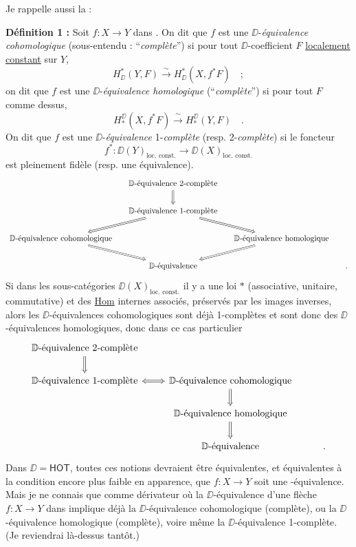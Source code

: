 Je rappelle aussi la :

\textbf{Définition 1 :} Soit $f : X \to Y$ dans \Dia. On dit que $f$ est une $\DD$-\textit{équivalence cohomologique} (sous-entendu : “\textit{complète}”) si pour tout $\DD$-coefficient $F$ \underline{localement} \underline{constant} sur $Y$,
\[ H^{*}_{\DD}(Y,F) \xrightarrow{\ \sim\ } H^{*}_{\DD}(X,f^{*}F) \quad ; \]
on dit que $f$ est une $\DD$-\textit{équivalence homologique} (“\textit{complète}”) si pour tout $F$ comme dessus,
\[ H_{*}^{\DD}(X,f^{*}F) \xrightarrow{\ \sim\ } H_{*}^{\DD}(Y,F) \quad . \]
On dit que $f$ est une $\DD$-\textit{équivalence} 1-\textit{complète} (resp. 2-\textit{complète}) si le foncteur
\[ f^{*} : \DD(Y)_{\text{loc. const.}} \longrightarrow \DD(X)_{\text{loc. const.}} \]
est pleinement fidèle (resp. une équivalence).
\[
\begin{tikzcd}[column sep=small]
 & \text{$\DD$-équivalence 2-complète} \arrow[d, Rightarrow] & & \\
 & \text{$\DD$-équivalence 1-complète} \arrow[dl, Rightarrow] \arrow[dr, Rightarrow] & & \\
\text{$\DD$-équivalence cohomologique} \arrow[dr, Rightarrow] & & \text{$\DD$-équivalence homologique} \arrow[dl, Rightarrow] & \\
 & \text{$\DD$-équivalence} & & .
\end{tikzcd}
\]
Si dans les sous-catégories $\DD(X)_{\text{loc. const.}}$ il y a une loi $*$ (associative, unitaire, commutative) et des \underline{\textsf{Hom}} internes associés, préservés par les images inverses, alors les $\DD$-équivalences cohomologiques sont déjà 1-complètes et sont donc des $\DD$-équivalences homologiques, donc dans ce cas particulier
\[
\begin{tikzcd}
\text{$\DD$-équivalence 2-complète} \arrow[d, Rightarrow] & & \\
\text{$\DD$-équivalence 1-complète} \arrow[r, Leftrightarrow] & \text{$\DD$-équivalence cohomologique} \arrow[d, Rightarrow] & \\
 & \text{$\DD$-équivalence homologique} \arrow[d, Rightarrow] & \\
 & \text{$\DD$-équivalence} & .
\end{tikzcd}
\]
Dans $\DD = \mathsf{HOT}$, toutes ces notions devraient être équivalentes, et équivalentes à la condition encore plus faible en apparence, que $f : X \to Y$ soit une \Hot-équivalence. Mais je ne connais que \HOT{} comme dérivateur où la $\DD$-équivalence d'une flèche $f : X \to Y$ dans \Dia{} implique déjà la $\DD$-équivalence cohomologique (complète), ou la $\DD$-équivalence homologique (complète), voire même la $\DD$-équivalence 1-complète. (Je reviendrai là-dessus tantôt.)

